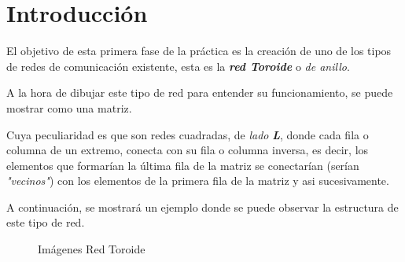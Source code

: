 \documentclass[11pt]{article}
\begin{document}

\tableofcontents
\pagebreak



\section{Introducción}
El objetivo de esta primera fase de la práctica es la creación de uno de los tipos de redes de comunicación existente, esta es la \textbf{\textit{red Toroide}} o \textit{de anillo}.

A la hora de dibujar este tipo de red para entender su funcionamiento, se puede mostrar como una matriz. 

Cuya peculiaridad es que son redes cuadradas, de \textit{lado} \textit{\textbf{L}}, donde cada fila o columna de un extremo, conecta con su fila o columna inversa, es decir, los elementos que formarían la última fila de la matriz se conectarían (serían \textit{"vecinos"}) con los elementos de la primera fila de la matriz y asi sucesivamente.

A continuación, se mostrará un ejemplo donde se puede observar la estructura de este tipo de red.

\begin{figure}[h!]
  \centering
  \caption{Imágenes Red Toroide}
  \label{fig:toroide}
\end{figure}
\end{document}
